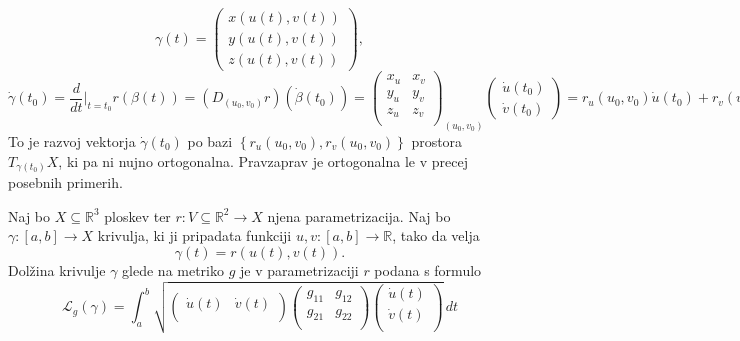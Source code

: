 \begin{equation*} \gamma(t) =  \begin{pmatrix}x(u(t), v(t))\\ y(u(t), v(t)) \\
z(u(t), v(t)) \end{pmatrix}, \end{equation*}
\begin{equation*} \dot{\gamma}(t_0) = \frac{d}{dt} \big|_{t = t_0} r(\beta(t)) =
(D_{(u_0, v_0)}r)(\dot{\beta}(t_0)) = 
\begin{pmatrix}
	x_u & x_v \\
	y_u & y_v \\
	z_u & z_v  \\

\end{pmatrix}_{(u_0, v_0)}
\begin{pmatrix}
	\dot{u}(t_0) \\ \dot{v}(t_0)
\end{pmatrix}
 = r_u(u_0 , v_0)\dot{u}(t_0) + r_v(u_0 , v_0)\dot{v}(t_0). \end{equation*}
 To je razvoj vektorja $\dot{\gamma}(t_0)$ po bazi $\left\{ r_u(u_0 ,
v_0), r_v(u_0 , v_0) \right\}$ prostora $T_{\gamma(t_0)}X$, ki pa ni
nujno ortogonalna. Pravzaprav je ortogonalna le v precej posebnih
primerih. 

\begin{definicija}
\label{def_dolzina_krivulje}
Naj bo $X \subseteq \mathbb{R}^3$ ploskev ter $r: V \subseteq \mathbb{R}^2 \to X$ njena parametrizacija. Naj bo $\gamma: [a,b] \to  X$ krivulja, ki ji pripadata funkciji $u, v: [a,b] \to  \mathbb{R}$, tako da velja \begin{equation*}
\gamma(t) = r(u(t), v(t)).
\end{equation*}  
   Dolžina krivulje $\gamma$ glede na metriko $g$ je v parametrizaciji $r$ podana s formulo 
\begin{equation*} \mathcal{L}_g(\gamma) = \int_{a}^{b} \sqrt{ 
\begin{pmatrix}
    \dot{u}(t) & \dot{v}(t) \\
\end{pmatrix}
\begin{pmatrix}
	g_{11} & g_{12}  \\
	g_{21} & g_{22} \\
\end{pmatrix}
\begin{pmatrix}
	\dot{u}(t) \\
	\dot{v}(t) \\
\end{pmatrix}
}  \, dt  \end{equation*}
\end{definicija}


